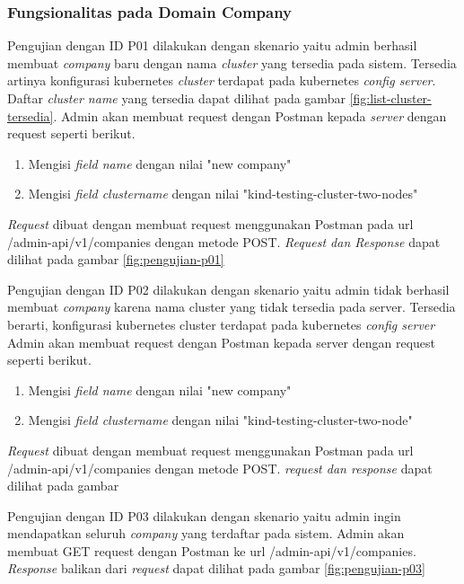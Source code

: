 \subsubsection{Fungsionalitas pada Domain Company}

Pengujian dengan ID P01 dilakukan dengan skenario yaitu admin berhasil membuat \textit{company} baru dengan nama \textit{cluster} yang tersedia pada sistem. Tersedia artinya konfigurasi kubernetes \textit{cluster} terdapat pada kubernetes \textit{config server}. Daftar \textit{cluster name} yang tersedia dapat dilihat pada gambar \ref{fig:list-cluster-tersedia}. Admin akan membuat request dengan Postman kepada \textit{server} dengan request seperti berikut.

\begin{enumerate}
  \item Mengisi \textit{field name} dengan nilai "new company"
  \item Mengisi \textit{field cluster\textunderscore name} dengan nilai "kind-testing-cluster-two-nodes"
\end{enumerate}

\textit{Request} dibuat dengan membuat request menggunakan Postman pada url /admin-api/v1/companies dengan metode POST. \textit{Request dan Response} dapat dilihat pada gambar \ref{fig:pengujian-p01}

Pengujian dengan ID P02 dilakukan dengan skenario yaitu admin tidak berhasil membuat \textit{company} karena nama cluster yang tidak tersedia pada server. Tersedia berarti, konfigurasi kubernetes cluster terdapat pada kubernetes \textit{config server} Admin akan membuat request dengan Postman kepada server dengan request seperti berikut.

\begin{enumerate}
  \item Mengisi \textit{field name} dengan nilai "new company"
  \item Mengisi \textit{field cluster\textunderscore name} dengan nilai "kind-testing-cluster-two-node"
\end{enumerate}

\textit{Request} dibuat dengan membuat request menggunakan Postman pada url /admin-api/v1/companies dengan metode POST. \textit{request dan response} dapat dilihat pada gambar


Pengujian dengan ID P03 dilakukan dengan skenario yaitu admin ingin mendapatkan seluruh \textit{company} yang terdaftar pada sistem. Admin akan membuat GET request dengan Postman ke url /admin-api/v1/companies. \textit{Response} balikan dari \textit{request} dapat dilihat pada gambar \ref{fig:pengujian-p03}


